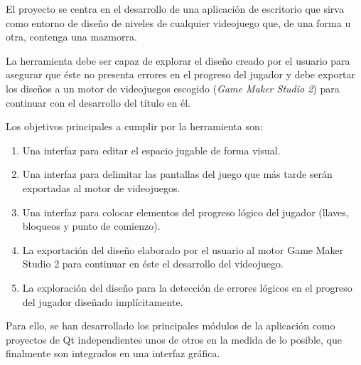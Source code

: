 El proyecto se centra en el desarrollo de una aplicación de escritorio que sirva como entorno de diseño de niveles de cualquier videojuego que, de una forma u otra, contenga una mazmorra.

La herramienta debe ser capaz de explorar el diseño creado por el usuario para asegurar que éste no presenta errores en el progreso del jugador y debe exportar los diseños a un motor de videojuegos escogido (\textit{Game Maker Studio 2}) para continuar con el desarrollo del título en él.

Los objetivos principales a cumplir por la herramienta son:
\begin{enumerate}
	\item Una interfaz para editar el espacio jugable de forma visual.
	\item Una interfaz para delimitar las pantallas del juego que más tarde serán exportadas al motor de videojuegos.
	\item Una interfaz para colocar elementos del progreso lógico del jugador (llaves, bloqueos y punto de comienzo).
	\item La exportación del diseño elaborado por el usuario al motor Game Maker Studio 2 para continuar en éste el desarrollo del videojuego.
	\item La exploración del diseño para la detección de errores lógicos en el progreso del jugador diseñado implícitamente.
\end{enumerate}

Para ello, se han desarrollado los principales módulos de la aplicación como proyectos de Qt independientes unos de otros en la medida de lo posible, que finalmente son integrados en una interfaz gráfica.